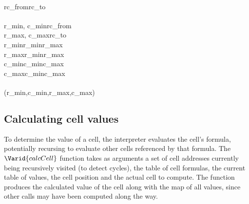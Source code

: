 \begin{hscode}
\\
\>[B]{}\;\;rc_{from}\;rc_{to}\mathrel{=}{}\<[E]%
\\
\>[B]{}\<[4]%
\>[4]{}\<[E]%
\\
\>[4]{}\<[7]%
\>[7]{}\llparenthesis \langle r_{min}\rangle , \langle c_{min}\rangle \rrparenthesis {}\<[41]%
\>[41]{}\mathrel{=}\;\;rc_{from}{}\<[E]%
\\
\>[4]{}\<[7]%
\>[7]{}\llparenthesis \langle r_{max}\rangle , {}\<[26]%
\>[26]{}\langle c_{max}\rangle \rrparenthesis {}\<[41]%
\>[41]{}\mathrel{=}\;\;rc_{to}{}\<[E]%
\\
\>[4]{}\<[7]%
\>[7]{}r_{min}{}\<[13]%
\>[13]{}\mathrel{=}\;{}\<[20]%
\>[20]{}r_{min}\;{}\<[27]%
\>[27]{}r_{max}{}\<[E]%
\\
\>[4]{}\<[7]%
\>[7]{}r_{max}{}\<[13]%
\>[13]{}\mathrel{=}\;{}\<[20]%
\>[20]{}r_{min}\;{}\<[27]%
\>[27]{}r_{max}{}\<[E]%
\\
\>[4]{}\<[7]%
\>[7]{}c_{min}{}\<[13]%
\>[13]{}\mathrel{=}\;{}\<[20]%
\>[20]{}c_{min}\;{}\<[27]%
\>[27]{}c_{max}{}\<[E]%
\\
\>[4]{}\<[7]%
\>[7]{}c_{max}{}\<[13]%
\>[13]{}\mathrel{=}\;{}\<[20]%
\>[20]{}c_{min}\;{}\<[27]%
\>[27]{}c_{max}{}\<[E]%
\\
\>[B]{}\<[4]%
\>[4]{}\<[E]%
\\
\>[4]{}\<[7]%
\>[7]{}(r_{min},c_{min},r_{max},c_{max}){}\<[E]%
\ColumnHook
\end{hscode}\resethooks

\subsection{Calculating cell values}
\label{calccell}

To determine the value of a cell, the interpreter evaluates the cell's
formula, potentially recursing to evaluate other cells referenced by that
formula. The \ensuremath{\Varid{calcCell}} function takes as arguments a set of cell addresses
currently being recursively visited (to detect cycles), the table of cell
formulas, the current table of values, the cell position and the actual cell
to compute. The function produces the calculated value of the cell along with
the map of all values, since other calls may have been computed along the
way. 

